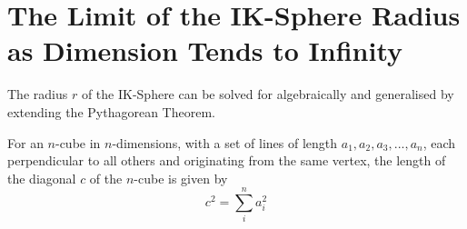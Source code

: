 \section{The Limit of the IK-Sphere Radius as Dimension Tends to Infinity}\label{section:limit of IK radius}
The radius $r$ of the IK-Sphere can be solved for algebraically and generalised by extending the Pythagorean Theorem.
\begin{lemma}\label{lemma:extend pythag}
    For an $n$-cube in $n$-dimensions, with a set of lines of length $a_1, a_2, a_3, ... , a_n$, each perpendicular to all others and originating from the same vertex, the length of the diagonal $c$ of the $n$-cube is given by
    \begin{equation}\label{extendedpythag}
        c^2 = \sum_{i}^{n}a_i^2
    \end{equation}
\end{lemma}
